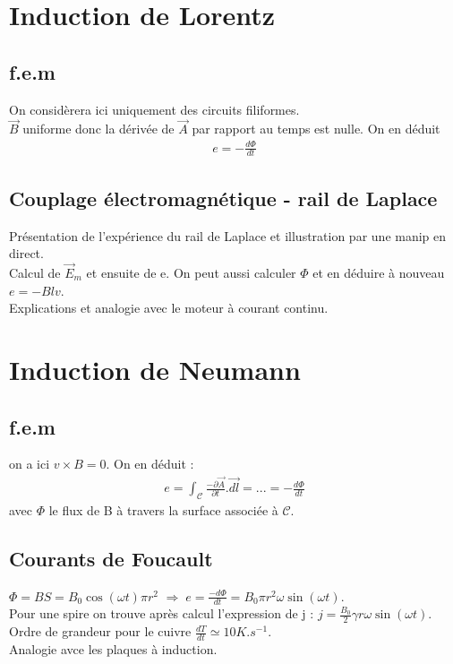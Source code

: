 \documentclass[12pt,prb,aps,epsf]{article}
\begin{document}
\section{Induction de Lorentz}
\subsection{f.e.m}
On considèrera ici uniquement des circuits filiformes.\\
$\vec{B}$ uniforme donc la dérivée de $\vec{A}$ par rapport au temps est nulle. On en déduit 
\begin{eqnarray}
e = - \frac{d\Phi}{dt}
\end{eqnarray}

\subsection{Couplage électromagnétique - rail de Laplace}

Présentation de l'expérience du rail de Laplace et illustration par une manip en direct.\\
Calcul de $\vec{E}_m$ et ensuite de e. On peut aussi calculer $\Phi$ et en déduire à nouveau $e=-Blv$.\\
Explications et analogie avec le moteur à courant continu.

\section{Induction de Neumann}

\subsection{f.e.m}
on a ici $v\times B = 0$. On en déduit :
\begin{eqnarray}
e = \int_{\mathcal{C}} \frac{-\partial\vec{A}}{\partial t}.\vec{dl} = ... = -\frac{d\Phi}{dt}
\end{eqnarray}
avec $\Phi$ le flux de B à travers la surface associée à $\mathcal{C}$.

\subsection{Courants de Foucault}
$\Phi = BS = B_0\cos(\omega t)\pi r^2$ $\Rightarrow\; e = \frac{-d\Phi}{dt} = B_0\pi r^2 \omega \sin(\omega t)$.\\
Pour une spire on trouve après calcul l'expression de j : $j=\frac{B_0}{2}\gamma r \omega  \sin(\omega t)$.\\
Ordre de grandeur pour le cuivre $\frac{dT}{dt} \simeq 10K.s^{-1}$.\\
Analogie avce les plaques à induction.
\end{document}
